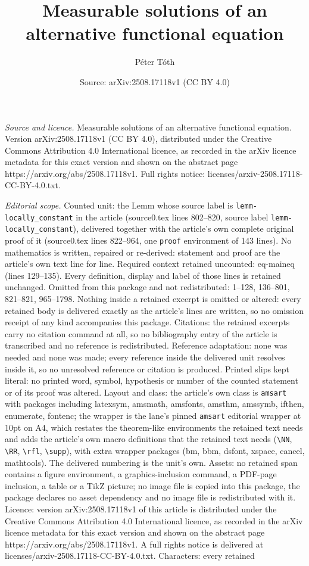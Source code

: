 \documentclass[10pt,a4paper]{amsart}
\title[Measurable solutions of an alternative functional equation]{Measurable solutions of an alternative functional equation}
\author{P\'eter T\'oth}
\date{Source: arXiv:2508.17118v1 (CC BY 4.0)}
\begin{document}
\maketitle

\noindent\emph{Source and licence.} Measurable solutions of an alternative functional equation. Version arXiv:2508.17118v1 (CC BY 4.0), distributed under the Creative Commons Attribution 4.0 International licence, as recorded in the arXiv licence metadata for this exact version and shown on the abstract page https://arxiv.org/abs/2508.17118v1. Full rights notice: licenses/arxiv-2508.17118-CC-BY-4.0.txt.\par\smallskip

\noindent\textit{Editorial scope.} Counted unit: the Lemm whose source label is \texttt{lemm-locally\_constant} in the article (source0.tex lines 802--820, source label \texttt{lemm-locally\_constant}), delivered together with the article's own complete original proof of it (source0.tex lines 822--964, one \texttt{proof} environment of 143 lines). No mathematics is written, repaired or re-derived: statement and proof are the article's own text line for line. Required context retained uncounted: eq-maineq (lines 129--135). Every definition, display and label of those lines is retained unchanged. Omitted from this package and not redistributed: 1--128, 136--801, 821--821, 965--1798. Nothing inside a retained excerpt is omitted or altered: every retained body is delivered exactly as the article's lines are written, so no omission receipt of any kind accompanies this package. Citations: the retained excerpts carry no citation command at all, so no bibliography entry of the article is transcribed and no reference is redistributed. Reference adaptation: none was needed and none was made; every reference inside the delivered unit resolves inside it, so no unresolved reference or citation is produced. Printed slips kept literal: no printed word, symbol, hypothesis or number of the counted statement or of its proof was altered. Layout and class: the article's own class is \texttt{amsart} with packages including latexsym, amsmath, amsfonts, amsthm, amssymb, ifthen, enumerate, fontenc; the wrapper is the lane's pinned \texttt{amsart} editorial wrapper at 10pt on A4, which restates the theorem-like environments the retained text needs and adds the article's own macro definitions that the retained text needs (\texttt{\textbackslash NN}, \texttt{\textbackslash RR}, \texttt{\textbackslash rfl}, \texttt{\textbackslash supp}), with extra wrapper packages (bm, bbm, dsfont, xspace, cancel, mathtools). The delivered numbering is the unit's own. Assets: no retained span contains a figure environment, a graphics-inclusion command, a PDF-page inclusion, a table or a TikZ picture; no image file is copied into this package, the package declares no asset dependency and no image file is redistributed with it. Licence: version arXiv:2508.17118v1 of this article is distributed under the Creative Commons Attribution 4.0 International licence, as recorded in the arXiv licence metadata for this exact version and shown on the abstract page https://arxiv.org/abs/2508.17118v1. A full rights notice is delivered at licenses/arxiv-2508.17118-CC-BY-4.0.txt. Characters: every retained 
\end{document}
